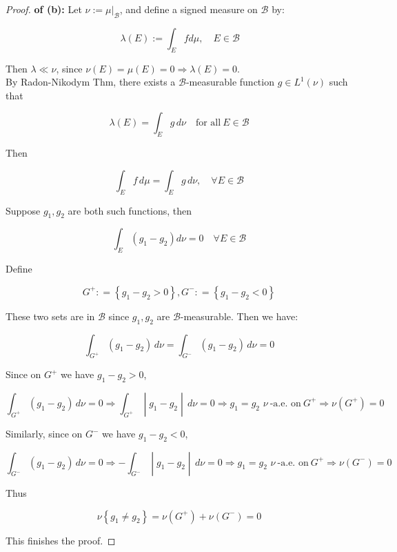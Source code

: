 \begin{proof}

\textbf{of (b):} Let \(\nu := \mu|_{\mathcal{B}}\), and define a signed measure on \(\mathcal{B}\) by:

\[\,\lambda(E) := \int_{E}fd\mu,\quad E \in \mathcal{B}\]

Then \(\lambda \ll \nu\), since \(\nu(E) = \mu(E) = 0\Longrightarrow\lambda(E) = 0\).\\
By Radon-Nikodym Thm, there exists a \(\mathcal{B}\)-measurable function \(g \in L^{1}(\nu)\) such that

\[\lambda(E) = \int_{E}g\, d\nu\quad\text{for all}\ E \in \mathcal{B}\]

Then

\[\int_{E}f\, d\mu = \int_{E}g\, d\nu,\quad\forall E \in \mathcal{B}\]

Suppose \(g_{1},g_{2}\) are both such functions, then

\[\int_{E}\left( {g_{1} - g_{2}} \right)d\nu = 0\quad\forall E \in \mathcal{B}\]

Define

\[G^{+}: = \left\{ {g_{1} - g_{2} > 0} \right\},G^{-}: = \left\{ {g_{1} - g_{2} < 0} \right\}\]

These two sets are in \(\mathcal{B}\) since \(g_{1},g_{2}\) are \(\mathcal{B}\)-measurable. Then we have:

\[\int_{G^{+}}(g_{1} - g_{2})\, d\nu = \int_{G^{-}}(g_{1} - g_{2})\, d\nu = 0\]

Since on \(G^{+}\) we have \(g_{1} - g_{2} > 0\),

\[\left. \int_{G^{+}}(g_{1} - g_{2})\, d\nu = 0\Longrightarrow\int_{G^{+}} \middle| g_{1} - g_{2} \middle| \, d\nu = 0\Longrightarrow g_{1} = g_{2}\,\,\nu\ \text{-a.e. on}\ G^{+}\Longrightarrow\nu(G^{+}) = 0 \right.\]

Similarly, since on \(G^{-}\) we have \(g_{1} - g_{2} < 0\),

\[\left. \int_{G^{-}}(g_{1} - g_{2})\, d\nu = 0\Longrightarrow - \int_{G^{-}} \middle| g_{1} - g_{2} \middle| \, d\nu = 0\Longrightarrow g_{1} = g_{2}\,\,\nu\ \text{-a.e. on}\ G^{+}\Longrightarrow\nu(G^{-}) = 0 \right.\]

Thus

\[\nu\left\{ {g_{1} \neq g_{2}} \right\} = \nu(G^{+}) + \nu(G^{-}) = 0\]

This finishes the proof.

\end{proof}

